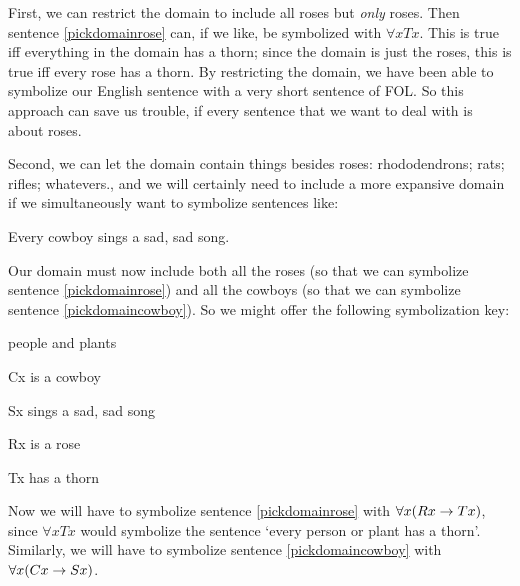 First, we can restrict the domain to include all roses but \emph{only} roses. Then sentence \ref{pickdomainrose} can, if we like, be symbolized with $\forall x Tx$. This is true iff everything in the domain has a thorn; since the domain is just the roses, this is true iff every rose has a thorn. By restricting the domain, we have been able to symbolize our English sentence with a very short sentence of FOL. So this approach can save us trouble, if every sentence that we want to deal with is about roses.

Second, we can let the domain contain things besides roses: rhododendrons; rats; rifles; whatevers., and we will certainly need to include a more expansive domain if we simultaneously want to symbolize sentences like:
	\begin{earg}
		\item[\ex{pickdomaincowboy}] Every cowboy sings a sad, sad song.
	\end{earg}
Our domain must now include both all the roses (so that we can symbolize sentence \ref{pickdomainrose}) and all the cowboys (so that we can symbolize sentence \ref{pickdomaincowboy}). So we might offer the following symbolization key:
	\begin{ekey}
		\item[\text{domain}] people and plants
		\item[Cx]  is a cowboy
		\item[Sx]  sings a sad, sad song
		\item[Rx]  is a rose
		\item[Tx]  has a thorn
	\end{ekey}
Now we will have to symbolize sentence \ref{pickdomainrose} with $\forall x (Rx \rightarrow Tx)$, since $\forall x Tx$ would symbolize the sentence `every person or plant has a thorn'. Similarly, we will have to symbolize sentence \ref{pickdomaincowboy} with $\forall x (Cx \rightarrow Sx)$.

